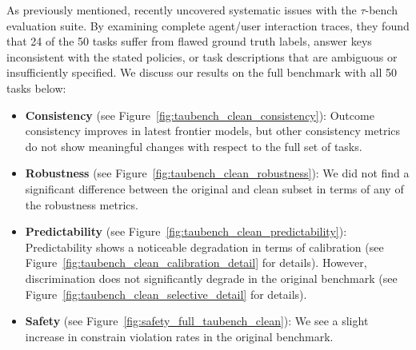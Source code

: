 \documentclass[11pt]{article}
\begin{document}
As previously mentioned, \citet{cuadron2025saber} recently uncovered systematic issues with the $\tau$-bench evaluation suite. By examining complete agent/user interaction traces, they found that 24 of the 50 tasks suffer from flawed ground truth labels, answer keys inconsistent with the stated policies, or task descriptions that are ambiguous or insufficiently specified. We discuss our results on the full benchmark with all 50 tasks below:
\begin{itemize}
    \item \textbf{Consistency} (see Figure~\ref{fig:taubench_clean_consistency}): Outcome consistency improves in latest frontier models, but other consistency metrics do not show meaningful changes with respect to the full set of tasks.
    \item \textbf{Robustness} (see Figure~\ref{fig:taubench_clean_robustness}): We did not find a significant difference between the original and clean subset in terms of any of the robustness metrics.
    \item \textbf{Predictability} (see Figure~\ref{fig:taubench_clean_predictability}): Predictability shows a noticeable degradation in terms of calibration (see Figure~\ref{fig:taubench_clean_calibration_detail} for details). However, discrimination does not significantly degrade in the original benchmark (see Figure~\ref{fig:taubench_clean_selective_detail} for details).
    \item \textbf{Safety} (see Figure~\ref{fig:safety_full_taubench_clean}): We see a slight increase in constrain violation rates in the original benchmark.
\end{itemize}
\end{document}
